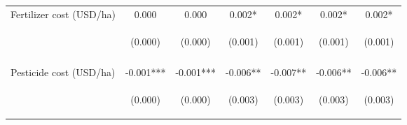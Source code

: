 \begin{center}
\begin{tabular}{lcccccc}
Fertilizer cost (USD/ha) & 0.000 & 0.000 & 0.002* & 0.002* & 0.002* & 0.002* \\
 & \begin{footnotesize}(0.000)\end{footnotesize} & \begin{footnotesize}(0.000)\end{footnotesize} & \begin{footnotesize}(0.001)\end{footnotesize} & \begin{footnotesize}(0.001)\end{footnotesize} & \begin{footnotesize}(0.001)\end{footnotesize} & \begin{footnotesize}(0.001)\end{footnotesize} \\
\vspace{4pt} & \begin{footnotesize}[0.437]\end{footnotesize} & \begin{footnotesize}[0.365]\end{footnotesize} & \begin{footnotesize}[0.067]\end{footnotesize} & \begin{footnotesize}[0.061]\end{footnotesize} & \begin{footnotesize}[0.068]\end{footnotesize} & \begin{footnotesize}[0.063]\end{footnotesize} \\
Pesticide cost (USD/ha) & -0.001*** & -0.001*** & -0.006** & -0.007** & -0.006** & -0.006** \\
 & \begin{footnotesize}(0.000)\end{footnotesize} & \begin{footnotesize}(0.000)\end{footnotesize} & \begin{footnotesize}(0.003)\end{footnotesize} & \begin{footnotesize}(0.003)\end{footnotesize} & \begin{footnotesize}(0.003)\end{footnotesize} & \begin{footnotesize}(0.003)\end{footnotesize} \\

\end{tabular}
\end{center}
